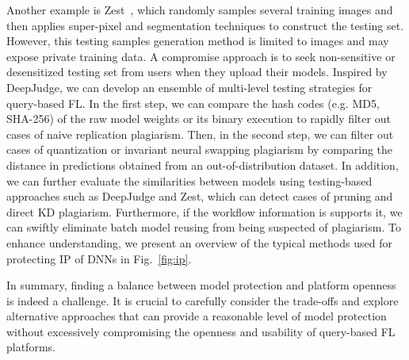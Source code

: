 Another example is Zest~\cite{jia2022zest}, which randomly samples several training images and then applies super-pixel and segmentation techniques to construct the testing set.
However, this testing samples generation method is limited to images and may expose private training data.
A compromise approach is to seek non-sensitive or desensitized testing set from users when they upload their models.
Inspired by DeepJudge, we can develop an ensemble of multi-level testing strategies for query-based FL.
In the first step, we can compare the hash codes (e.g. MD5, SHA-256) of the raw model weights or its binary execution to rapidly filter out cases of naive replication plagiarism.
Then, in the second step, we can filter out cases of quantization or invariant neural swapping plagiarism by comparing the distance in predictions obtained from an out-of-distribution dataset.
In addition, we can further evaluate the similarities between models using testing-based approaches such as DeepJudge and Zest, which can detect cases of pruning and direct KD plagiarism.
Furthermore, if the workflow information is supports it, we can swiftly eliminate batch model reusing from being suspected of plagiarism.
To enhance understanding, we present an overview of the typical methods used for protecting IP of DNNs in Fig.~\ref{fig:ip}.

In summary, finding a balance between model protection and platform openness is indeed a challenge.
It is crucial to carefully consider the trade-offs and explore alternative approaches that can provide a reasonable level of model protection without excessively compromising the openness and usability of query-based FL platforms.


